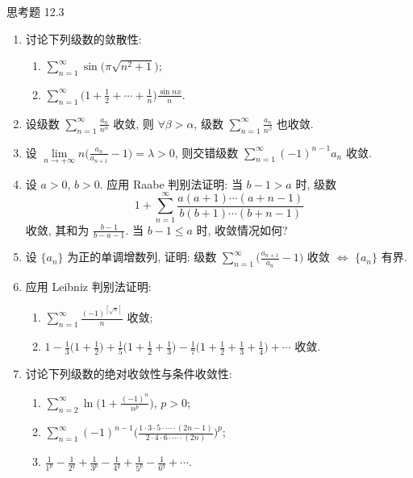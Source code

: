 \begin{exblock}{思考题 12.3}
\begin{enumerate}
  \item 讨论下列级数的敛散性:
  \begin{enumerate}
    \item $\displaystyle\sum_{n=1}^{\infty}\sin\bigl(\pi\sqrt{n^{2}+1}\bigr)$;
    \item $\displaystyle\sum_{n=1}^{\infty}\biggl(1+\frac{1}{2}+\cdots+\frac{1}{n}\biggr)\frac{\sin nx}{n}$.
  \end{enumerate}
  \item 设级数 $\sum_{n=1}^{\infty}\frac{a_{n}}{n^{\alpha}}$ 收敛, 则 $\forall\beta>\alpha$, 级数 $\sum_{n=1}^{\infty}\frac{a_{n}}{n^{\beta}}$ 也收敛.
  \item 设 $\lim\limits_{n\to+\infty}n\bigl(\frac{a_{n}}{a_{n+1}}-1\bigr)=\lambda>0$, 则交错级数 $\sum_{n=1}^{\infty}(-1)^{n-1}a_{n}$ 收敛.
  \item 设 $a>0$, $b>0$. 应用 Raabe 判别法证明: 当 $b-1>a$ 时, 级数
  \[
    1+\sum_{n=1}^{\infty}\frac{a(a+1)\cdots(a+n-1)}{b(b+1)\cdots(b+n-1)}
\]
  收敛, 其和为 $\frac{b-1}{b-a-1}$. 当 $b-1\leqslant a$ 时, 收敛情况如何?
  \item 设 $\{a_{n}\}$ 为正的单调增数列, 证明: 级数 $\sum_{n=1}^{\infty}\bigl(\frac{a_{n+1}}{a_{n}}-1\bigr)$ 收敛 $\Leftrightarrow$ $\{a_{n}\}$ 有界.
  \item 应用 Leibniz 判别法证明:
  \begin{enumerate}
    \item $\displaystyle\sum_{n=1}^{\infty}\frac{(-1)^{[\sqrt{n}]}}{n}$ 收敛;
    \item $\displaystyle 1-\frac{1}{3}\biggl(1+\frac{1}{2}\biggr)
          +\frac{1}{5}\biggl(1+\frac{1}{2}+\frac{1}{3}\biggr)
          -\frac{1}{7}\biggl(1+\frac{1}{2}+\frac{1}{3}+\frac{1}{4}\biggr)+\cdots$ 收敛.
  \end{enumerate}
  \item 讨论下列级数的绝对收敛性与条件收敛性:
  \begin{enumerate}
    \item $\displaystyle\sum_{n=2}^{\infty}\ln\biggl(1+\frac{(-1)^{n}}{n^{p}}\biggr)$, $p>0$;
    \item $\displaystyle\sum_{n=1}^{\infty}(-1)^{n-1}
          \biggl(\frac{1\cdot 3\cdot 5\cdot\cdots\cdot(2n-1)}
          {2\cdot 4\cdot 6\cdot\cdots\cdot(2n)}\biggr)^{p}$;
    \item $\displaystyle\frac{1}{1^{p}}-\frac{1}{2^{q}}+\frac{1}{3^{p}}-\frac{1}{4^{q}}
          +\frac{1}{5^{p}}-\frac{1}{6^{q}}+\cdots$.

\end{enumerate}
\end{enumerate}
\end{exblock}
